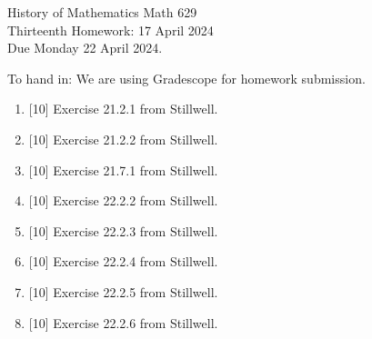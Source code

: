 \documentclass[12pt]{article}
\begin{document}
\LARGE 
\noindent
{\color{Maroon}History of Mathematics \hfill Math 629}\vspace{2pt}\\
\large
Thirteenth Homework: \hfill 17 April 2024\\
Due Monday 22 April 2024.
\normalsize\vspace{10pt}

To hand in: We are using Gradescope for homework submission.

\begin{enumerate}

\item  {[10]}
     Exercise 21.2.1 from Stillwell. 
\item  {[10]}
     Exercise 21.2.2 from Stillwell.

\item  {[10]}
     Exercise 21.7.1 from Stillwell.

     
\item  {[10]}
  Exercise 22.2.2 from Stillwell.
\item  {[10]}
  Exercise 22.2.3 from Stillwell.
\item  {[10]}
  Exercise 22.2.4 from Stillwell.
\item  {[10]}
  Exercise 22.2.5 from Stillwell.
\item  {[10]}
  Exercise 22.2.6 from Stillwell.

  \end{enumerate}
\end{document}
